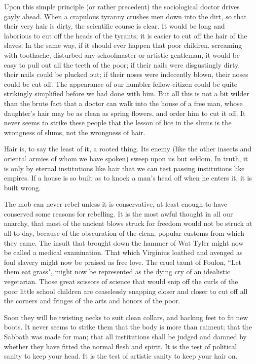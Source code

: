 \documentclass[final,10pt,letterpaper,twocolumn,openany]{book}
\begin{document}
Upon this simple principle (or rather precedent) the sociological doctor
drives gayly ahead. When a crapulous tyranny crushes men down into the
dirt, so that their very hair is dirty, the scientific course is clear. It would
be long and laborious to cut off the heads of the tyrants; it is easier to cut
off the hair of the slaves. In the same way, if it should ever happen that
poor children, screaming with toothache, disturbed any schoolmaster or
artistic gentleman, it would be easy to pull out all the teeth of the poor; if
their nails were disgustingly dirty, their nails could be plucked out; if their
noses were indecently blown, their noses could be cut off. The appearance
of our humbler fellow-citizen could be quite strikingly simplified before
we had done with him. But all this is not a bit wilder than the brute fact
that a doctor can walk into the house of a free man, whose daughter's hair
may be as clean as spring flowers, and order him to cut it off. It never
seems to strike these people that the lesson of lice in the slums is the
wrongness of slums, not the wrongness of hair. 

Hair is, to say the least of
it, a rooted thing. Its enemy (like the other insects and oriental armies of
whom we have spoken) sweep upon us but seldom. In truth, it is only by
eternal institutions like hair that we can test passing institutions like
empires. If a house is so built as to knock a man's head off when he enters
it, it is built wrong.

The mob can never rebel unless it is conservative, at least enough to
have conserved some reasons for rebelling. It is the most awful thought in
all our anarchy, that most of the ancient blows struck for freedom would
not be struck at all to-day, because of the obscuration of the clean, popular
customs from which they came. The insult that brought down the hammer
of Wat Tyler might now be called a medical examination. That which
Virginius loathed and avenged as foul slavery might now be praised as
free love. The cruel taunt of Foulon, ``Let them eat grass", might now be
represented as the dying cry of an idealistic vegetarian. Those great
scissors of science that would snip off the curls of the poor little school
children are ceaselessly snapping closer and closer to cut off all the
corners and fringes of the arts and honors of the poor. 

Soon they will be
twisting necks to suit clean collars, and hacking feet to fit new boots. It
never seems to strike them that the body is more than raiment; that the
Sabbath was made for man; that all institutions shall be judged and
damned by whether they have fitted the normal flesh and spirit. It is the
test of political sanity to keep your head. It is the test of artistic sanity to
keep your hair on.
\end{document}
